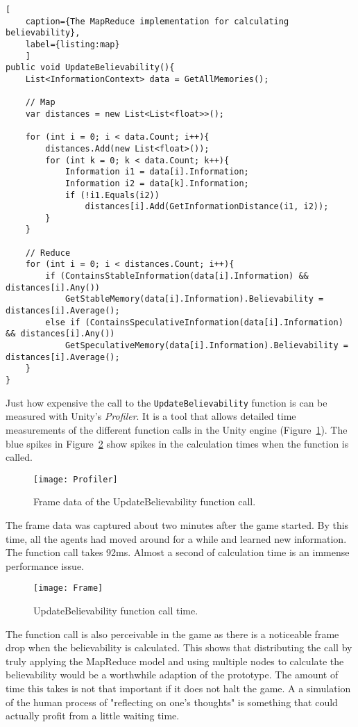 \begin{lstlisting}[
	caption={The MapReduce implementation for calculating believability},
	label={listing:map}
	]
public void UpdateBelievability(){
	List<InformationContext> data = GetAllMemories();
	
	// Map
	var distances = new List<List<float>>();
	
	for (int i = 0; i < data.Count; i++){
		distances.Add(new List<float>());
		for (int k = 0; k < data.Count; k++){
			Information i1 = data[i].Information;
			Information i2 = data[k].Information;
			if (!i1.Equals(i2))
				distances[i].Add(GetInformationDistance(i1, i2));
		}
	}
	
	// Reduce
	for (int i = 0; i < distances.Count; i++){
		if (ContainsStableInformation(data[i].Information) && distances[i].Any())
			GetStableMemory(data[i].Information).Believability = distances[i].Average();
		else if (ContainsSpeculativeInformation(data[i].Information) && distances[i].Any())
			GetSpeculativeMemory(data[i].Information).Believability = distances[i].Average();
	}
}
\end{lstlisting}
Just how expensive the call to the \verb|UpdateBelievability| function is can be measured with Unity's \textit{Profiler}. It is a tool that allows detailed time measurements of the different function calls in the Unity engine (Figure~\ref{fig:profiler}). The blue spikes in Figure~\ref{fig:frame} show spikes in the calculation times when the function is called.
\begin{figure}
	\centering
	\texttt{[image: Profiler]}
	\caption{Frame data of the UpdateBelievability function call.}
	\label{fig:profiler}
\end{figure}
The frame data was captured about two minutes after the game started. By this time, all the agents had moved around for a while and learned new information. The function call takes 92ms. Almost a second of calculation time is an immense performance issue.
\begin{figure}
	\centering
	\texttt{[image: Frame]}
	\caption{UpdateBelievability function call time.}
	\label{fig:frame}
\end{figure}
The function call is also perceivable in the game as there is a noticeable frame drop when the believability is calculated. This shows that distributing the call by truly applying the MapReduce model and using multiple nodes to calculate the believability would be a worthwhile adaption of the prototype. The amount of time this takes is not that important if it does not halt the game. A a simulation of the human process of "reflecting on one's thoughts" is something that could actually profit from a little waiting time.
